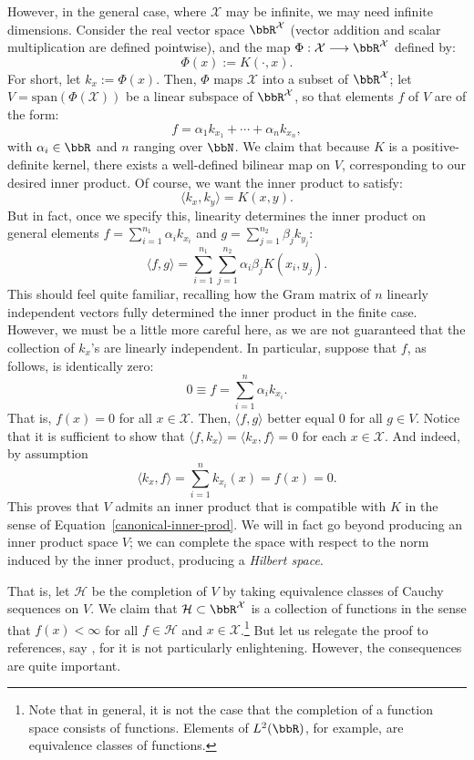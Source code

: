 \documentclass[twoside,11pt]{homework}
\renewcommand{\to}{\longrightarrow}
\begin{document}
\begin{multicols}{2}
However, in the general case, where $\mathcal{X}$ may be infinite, we may need infinite dimensions. Consider the real vector space $\bbR^\mathcal{X}$ (vector addition and scalar multiplication are defined pointwise), and the map $\Phi: \mathcal{X} \to \bbR^\mathcal{X}$ defined by:
\[\Phi(x) :=K(\cdot, x).\]
For short, let $k_x := \Phi(x)$. Then, $\Phi$ maps $\mathcal{X}$ into a subset of $\bbR^\mathcal{X}$; let $V = \mathrm{span}(\Phi(\mathcal{X}))$ be a linear subspace of $\bbR^\mathcal{X}$, so that elements $f$ of $V$ are of the form:
\[f= \alpha_1k_{x_1} + \dotsm + \alpha_n k_{x_n},\]
with $\alpha_i \in \bbR$ and $n$ ranging over $\bbN$. We claim that because $K$ is a positive-definite kernel, there exists a well-defined bilinear map on $V$, corresponding to our desired inner product. Of course, we want the inner product to satisfy:
\[\langle k_x, k_y\rangle = K(x,y).\]
But in fact, once we specify this, linearity determines the inner product on general elements $f = \sum_{i=1}^{n_1} \alpha_i k_{x_i}$ and $g = \sum_{j=1}^{n_2} \beta_j k_{y_j}$:
\[\langle f, g \rangle = \sum_{i=1}^{n_1} \sum_{j=1}^{n_2} \alpha_i \beta_j K(x_i, y_j).\]
This should feel quite familiar, recalling how the Gram matrix of $n$ linearly independent vectors fully determined the inner product in the finite case. However, we must be a little more careful here, as we are not guaranteed that the collection of $k_x$'s are linearly independent. In particular, suppose that $f$, as follows, is identically zero:
\[0 \equiv f = \sum_{i=1}^n \alpha_i k_{x_i}.\]
That is, $f(x) = 0$ for all $x \in \mathcal{X}$. Then, $\langle f, g\rangle$ better equal 0 for all $g \in V$. Notice that it is sufficient to show that $\langle f, k_x\rangle = \langle k_x , f\rangle = 0$ for each $x \in \mathcal{X}$. And indeed, by assumption
\[\langle k_x, f\rangle = \sum_{i=1}^n k_{x_i}(x) = f(x) = 0.\]
This proves that $V$ admits an inner product that is compatible with $K$ in the sense of Equation~\ref{canonical-inner-prod}. We will in fact go beyond producing an inner product space $V$; we can complete the space with respect to the norm induced by the inner product, producing a \emph{Hilbert space}.

That is, let $\mathcal{H}$ be the completion of $V$ by taking equivalence classes of Cauchy sequences on $V$. We claim that $\mathcal{H} \subset \bbR^\mathcal{X}$ is a collection of functions in the sense that $f(x) < \infty$ for all $f \in \mathcal{H}$ and $x \in \mathcal{X}$.\footnote{Note that in general, it is not the case that the completion of a function space consists of functions. Elements of $L^2(\bbR)$, for example, are equivalence classes of functions.} But let us relegate the proof to references, say \cite[Thm 3.16]{P2009}, for it is not particularly enlightening. However, the consequences are quite important.


\end{multicols}
\end{document}

